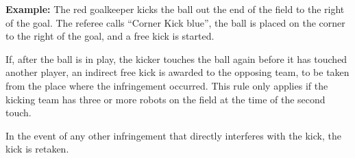 
\textbf{Example:} The red goalkeeper kicks the ball out the end of the field to the right of the goal.
The referee calls ``Corner Kick blue'', the ball is placed on the corner to the right of the goal, and a free kick is started.


If, after the ball is in play, the kicker touches the ball again before it has touched another player, an indirect free kick is awarded to the opposing team, to be taken from the place where the infringement occurred. This rule only applies if the kicking team has three or more robots on the field at the time of the second touch.

In the event of any other infringement that directly interferes with the kick, the kick is retaken.

